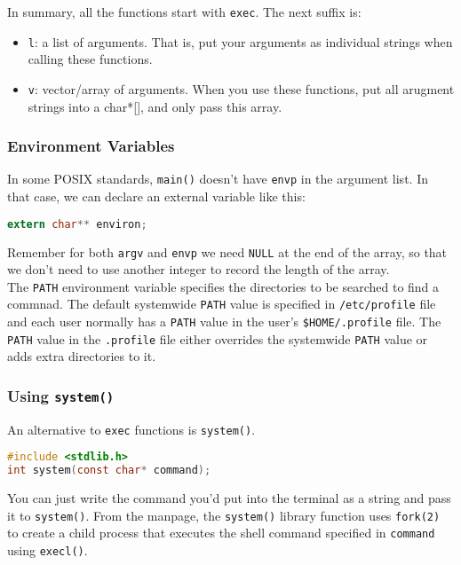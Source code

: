 \documentclass{article}
\renewcommand{\b}{\item[$\circ$]}
\newcommand{\newlist}{\begin{itemize}}
\renewcommand{\endlist}{\end{itemize}}
\newcommand{\code}[1]{\texttt{#1}}
\begin{document}
In summary, all the functions start with \code{exec}. The next suffix is:

\newlist
\b \code{l}: a list of arguments. That is, put your arguments as individual strings when calling these functions.
\b \code{v}: vector/array of arguments. When you use these functions, put all arugment strings into a char*[], and only pass this array.
\endlist

\subsubsection{Environment Variables}

In some POSIX standards, \code{main()} doesn't have \code{envp} in the argument list. In that case, we can declare an external variable like this:

\begin{lstlisting}[language=C]
extern char** environ;
\end{lstlisting}

\noindent Remember for both \code{argv} and \code{envp} we need \code{NULL} at the end of the array, so that we don't need to use another integer to record the length of the array. \\ 

\noindent The \code{PATH} environment variable specifies the directories to be searched to find a commnad. The default systemwide \code{PATH} value is specified in \code{/etc/profile} file and each user normally has a \code{PATH} value in the user's \code{\$HOME/.profile} file. The \code{PATH} value in the \code{.profile} file either overrides the systemwide \code{PATH} value or adds extra directories to it. 

\subsubsection{Using \code{system()}}

An alternative to \code{exec} functions is \code{system()}.

\begin{lstlisting}[language=C]
#include <stdlib.h>
int system(const char* command);
\end{lstlisting}

\noindent You can just write the command you'd put into the terminal as a string and pass it to \code{system()}. From the manpage, the \code{system()} library function uses \code{fork(2)} to create a child process that executes the shell command specified in \code{command} using \code{execl()}. 
\end{document}

